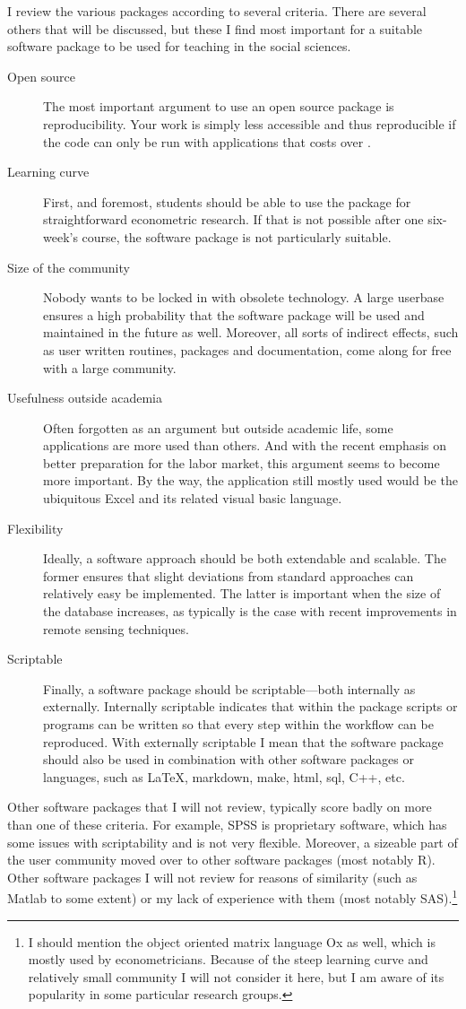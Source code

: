 \documentclass[fleqn,10pt]{SelfArx} %
\begin{document}
I review the various packages according to several criteria. There are several
others that will be discussed, but these I find most important for a suitable
software package to be used for teaching in the social sciences. 
\begin{description}
\item[Open source] The most important argument to use an open source package is
  reproducibility. Your work is simply less accessible and thus reproducible if
  the code can only be run with applications that costs over . 
\item[Learning curve] First, and foremost, students should be able to use the
  package for straightforward econometric research. If that is not possible
  after one six-week's course, the software package is not particularly
  suitable. 
\item[Size of the community] Nobody wants to be locked in with obsolete
  technology. A large userbase ensures a high probability that the software
  package will be used and maintained in the future as well. Moreover, all sorts
  of indirect effects, such as user written routines, packages and
  documentation, come along for free with a large community. 
\item[Usefulness outside academia] Often forgotten as an argument but outside
  academic life, some applications are more used than others. And with the
  recent emphasis on better preparation for the labor market, this argument
  seems to become more important. By the way, the
  application still mostly used would be the ubiquitous Excel and its related
  visual basic language.
\item[Flexibility] Ideally, a software approach should be both extendable and scalable. The former ensures that slight deviations from standard approaches can relatively easy be implemented. The latter is important when the size of the database increases, as typically is the case with recent improvements in remote sensing techniques.
\item[Scriptable] Finally, a software package should be scriptable---both internally as externally. Internally scriptable indicates that within the package scripts or programs can be written so that every step within the workflow can be reproduced. With externally scriptable I mean that the software package should also be used in combination with other software packages or languages, such as \LaTeX, markdown, make, html, sql, C++, etc.
\end{description}
Other software packages that I will not review, typically score badly on more than one of these criteria. For example, SPSS is proprietary software, which has some issues with scriptability and is not very flexible. Moreover, a sizeable part of the user community moved over to other software packages (most notably R). Other software packages I will not review for reasons of similarity (such as Matlab to some extent) or my lack of experience with them (most notably SAS).\footnote{I should mention the object oriented matrix language Ox as well, which is mostly used by econometricians. Because of the steep learning curve and relatively small community I will not consider it here, but I am aware of its popularity in some particular research groups.}
\end{document}
